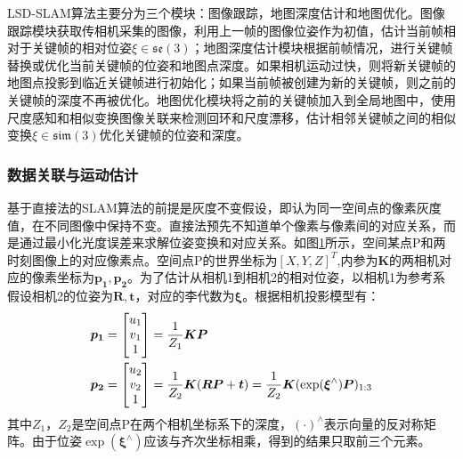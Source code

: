 LSD-SLAM算法主要分为三个模块：图像跟踪，地图深度估计和地图优化。图像跟踪模块获取传相机采集的图像，利用上一帧的图像位姿作为初值，估计当前帧相对于关键帧的相对位姿$\xi \in \mathfrak{se}(3) $；地图深度估计模块根据前帧情况，进行关键帧替换或优化当前关键帧的位姿和地图点深度。如果相机运动过快，则将新关键帧的地图点投影到临近关键帧进行初始化；如果当前帧被创建为新的关键帧，则之前的关键帧的深度不再被优化。地图优化模块将之前的关键帧加入到全局地图中，使用尺度感知和相似变换图像关联来检测回环和尺度漂移，估计相邻关键帧之间的相似变换$\xi \in \mathfrak{sim}(3)$优化关键帧的位姿和深度。

\subsubsection*{数据关联与运动估计}
基于直接法的SLAM算法的前提是灰度不变假设，即认为同一空间点的像素灰度值，在不同图像中保持不变。直接法预先不知道单个像素与像素间的对应关系，而是通过最小化光度误差来求解位姿变换和对应关系。如图\ref{fig3.5}所示，空间某点P和两时刻图像上的对应像素点。空间点P的世界坐标为$[X,Y,Z]^T$,内参为$\boldsymbol{K}$的两相机对应的像素坐标为$\boldsymbol{p_1},\boldsymbol{p_2}$。为了估计从相机1到相机2的相对位姿，以相机1为参考系假设相机2的位姿为$\boldsymbol{R},\boldsymbol{t}$，对应的李代数为$\boldsymbol{\xi}$。根据相机投影模型有：
\begin{equation}
\label{equ3.8}
\begin{aligned}
& \boldsymbol{p_1} = 
\begin{bmatrix}
u_1 \cr v_1 \cr 1 \cr 
\end{bmatrix}
={1 \over Z_1} \boldsymbol{K} \boldsymbol{P}
\\
& \boldsymbol{p_2} = 
\begin{bmatrix}
u_2 \cr v_2 \cr 1 \cr
\end{bmatrix}
={1 \over Z_2} \boldsymbol{K} ( \boldsymbol{R} \boldsymbol{P}+\boldsymbol{t}) = {1 \over Z_2} \boldsymbol{K} ( \exp (\boldsymbol{\xi}^{\wedge}) \boldsymbol{P})_{1:3}
\end{aligned}
\end{equation}
其中$Z_1$，$Z_2$是空间点P在两个相机坐标系下的深度，$(\cdot)^{\wedge}$表示向量的反对称矩阵。由于位姿$\exp(\boldsymbol{\xi}^{\wedge})$应该与齐次坐标相乘，得到的结果只取前三个元素。
\begin{figure}
\label{fig3.5}
\end{figure}

